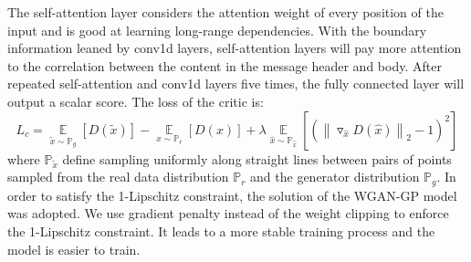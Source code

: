 The self-attention layer considers the attention weight of every position of the input and is good at learning long-range dependencies. With the boundary information leaned by conv1d layers, self-attention layers will pay more attention to the correlation between the content in the message header and body. After repeated self-attention and conv1d layers five times, the fully connected layer will output a scalar score. 
The loss of the critic is:
\begin{equation}
L_{c} = \mathop{\mathbb{E}}\limits_{\tilde{x}\sim\mathbb{P}_{g}}\left [ D(\tilde{x}) \right ] 
- \mathop{\mathbb{E}}\limits_{x\sim\mathbb{P}_{r}}\left [ D(x) \right ] 
+ \lambda\mathop{\mathbb{E}}\limits_{\hat{x}\sim\mathbb{P}_{\hat{x}}}\left [ ( \left \| \triangledown_{\hat{x}}D( \hat{x}) \right \|_{2} - 1 )^{2} \right ]
\end{equation}
where $\mathbb{P}_{\tilde{x}}$ define sampling uniformly along straight lines between pairs of points sampled from the real data distribution $\mathbb{P}_{r}$ and the generator distribution $\mathbb{P}_{g}$. 
In order to satisfy the 1-Lipschitz constraint, the solution of the WGAN-GP model was adopted. 
We use gradient penalty instead of the weight clipping to enforce the 1-Lipschitz constraint. 
It leads to a more stable training process and the model is easier to train.

